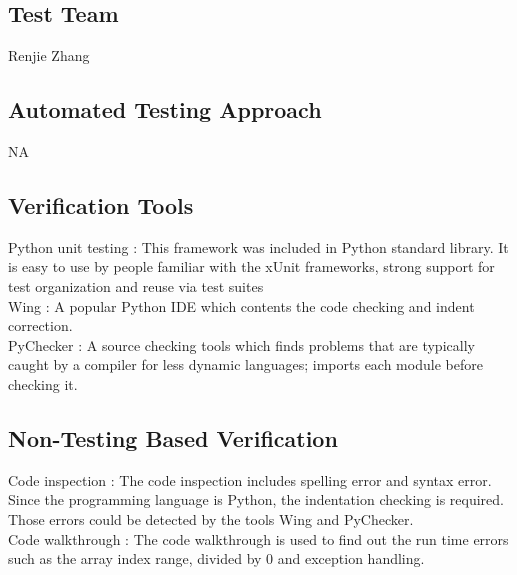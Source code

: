 \documentclass[12pt, titlepage]{article}
\begin{document}
\subsection{Test Team}

Renjie Zhang

\subsection{Automated Testing Approach}
NA
\subsection{Verification Tools}
Python unit testing : This framework was included in Python standard library. It is easy to use by people familiar with the xUnit frameworks, strong support for test organization and reuse via test suites\\
Wing : A popular Python IDE which contents the code checking and indent correction.\\
PyChecker :  A source checking tools which finds problems that are typically caught by a compiler for less dynamic languages; imports each module before checking it.\\


		

\subsection{Non-Testing Based Verification}
Code inspection :  The code inspection includes spelling error and syntax error. Since the programming language is Python, the indentation checking is required.  Those errors could be detected by the tools Wing and PyChecker. \\
Code walkthrough  : The code walkthrough is used to find out the run time errors such as the array index range, divided by 0 and exception handling.\\

\end{document}
